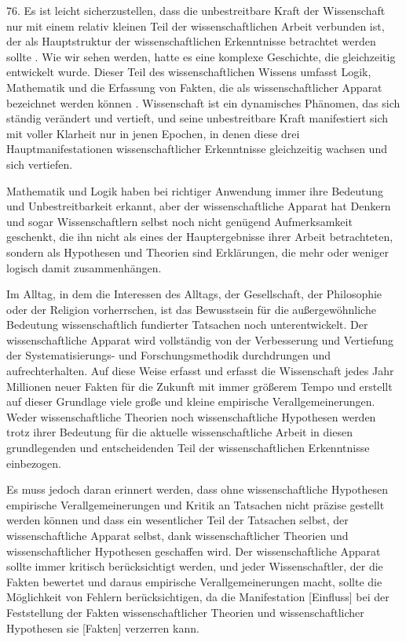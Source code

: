 \documentclass[11pt,a4paper]{book}
\begin{document}
76. Es ist leicht sicherzustellen, dass die unbestreitbare Kraft der Wissenschaft nur mit einem relativ kleinen Teil der wissenschaftlichen Arbeit verbunden ist, der als Hauptstruktur der wissenschaftlichen Erkenntnisse betrachtet werden sollte . Wie wir sehen werden, hatte es eine komplexe Geschichte, die gleichzeitig entwickelt wurde. Dieser Teil des wissenschaftlichen Wissens umfasst Logik, Mathematik und die Erfassung von Fakten, die als wissenschaftlicher Apparat bezeichnet werden können . Wissenschaft ist ein dynamisches Phänomen, das sich ständig verändert und vertieft, und seine unbestreitbare Kraft manifestiert sich mit voller Klarheit nur in jenen Epochen, in denen diese drei Hauptmanifestationen wissenschaftlicher Erkenntnisse gleichzeitig wachsen und sich vertiefen.



Mathematik und Logik haben bei richtiger Anwendung immer ihre Bedeutung und Unbestreitbarkeit erkannt, aber der wissenschaftliche Apparat hat Denkern und sogar Wissenschaftlern selbst noch nicht genügend Aufmerksamkeit geschenkt, die ihn nicht als eines der Hauptergebnisse ihrer Arbeit betrachteten, sondern als Hypothesen und Theorien sind Erklärungen, die mehr oder weniger logisch damit zusammenhängen.



Im Alltag, in dem die Interessen des Alltags, der Gesellschaft, der Philosophie oder der Religion vorherrschen, ist das Bewusstsein für die außergewöhnliche Bedeutung wissenschaftlich fundierter Tatsachen noch unterentwickelt. Der wissenschaftliche Apparat wird vollständig von der Verbesserung und Vertiefung der Systematisierungs- und Forschungsmethodik durchdrungen und aufrechterhalten. Auf diese Weise erfasst und erfasst die Wissenschaft jedes Jahr Millionen neuer Fakten für die Zukunft mit immer größerem Tempo und erstellt auf dieser Grundlage viele große und kleine empirische Verallgemeinerungen. Weder wissenschaftliche Theorien noch wissenschaftliche Hypothesen werden trotz ihrer Bedeutung für die aktuelle wissenschaftliche Arbeit in diesen grundlegenden und entscheidenden Teil der wissenschaftlichen Erkenntnisse einbezogen.



Es muss jedoch daran erinnert werden, dass ohne wissenschaftliche Hypothesen empirische Verallgemeinerungen und Kritik an Tatsachen nicht präzise gestellt werden können und dass ein wesentlicher Teil der Tatsachen selbst, der wissenschaftliche Apparat selbst, dank wissenschaftlicher Theorien und wissenschaftlicher Hypothesen geschaffen wird. Der wissenschaftliche Apparat sollte immer kritisch berücksichtigt werden, und jeder Wissenschaftler, der die Fakten bewertet und daraus empirische Verallgemeinerungen macht, sollte die Möglichkeit von Fehlern berücksichtigen, da die Manifestation [Einfluss] bei der Feststellung der Fakten wissenschaftlicher Theorien und wissenschaftlicher Hypothesen sie [Fakten] verzerren kann.
\end{document}
